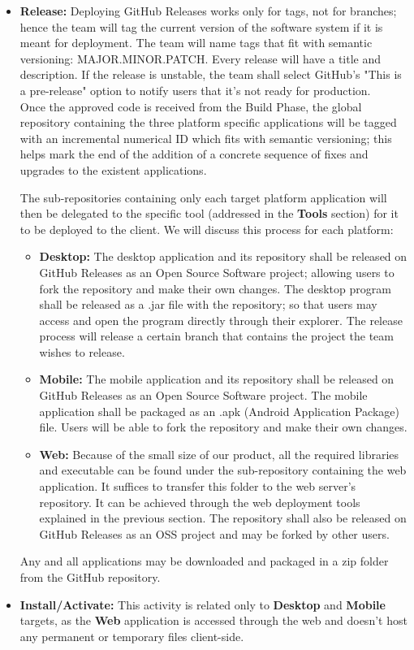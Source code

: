 \documentclass[12pt]{report}
\begin{document}
\begin{itemize}
   \item \textbf{Release:}
   Deploying GitHub Releases works only for tags, not for branches; hence the team will tag the current version of the software system if it is meant for deployment. The team will name tags that fit with semantic versioning: MAJOR.MINOR.PATCH. Every release will have a title and description. If the release is unstable, the team shall select GitHub's "This is a pre-release" option to notify users that it's not ready for production.\\
   
   Once the approved code is received from the Build Phase, the global repository containing the three platform specific applications will be tagged with an incremental numerical ID which fits with semantic versioning; this helps mark the end of the addition of a concrete sequence of fixes and upgrades to the existent applications. 
   
   The sub-repositories containing only each target platform application will then be delegated to the specific tool (addressed in the \textbf{Tools} section) for it to be deployed to the client. We will discuss this process for each platform:
   \begin{itemize}
   	\item \textbf{Desktop:} The desktop application and its repository shall be released on GitHub Releases as an Open Source Software project; allowing users to fork the repository and make their own changes. The desktop program shall be released as a .jar file with the repository; so that users may access and open the program directly through their explorer. The release process will release a certain branch that contains the project the team wishes to release.
   	\item \textbf{Mobile:} The mobile application and its repository shall be released on GitHub Releases as an Open Source Software project. The mobile application shall be packaged as an .apk (Android Application Package) file. Users will be able to fork the repository and make their own changes.
   	\item \textbf{Web:} Because of the small size of our product, all the required libraries and executable can be found under the sub-repository containing the web application. It suffices to transfer this folder to the web server's repository. It can be achieved through the web deployment tools explained in the previous section. The repository shall also be released on GitHub Releases as an OSS project and may be forked by other users.
   \end{itemize}
   Any and all applications may be downloaded and packaged in a zip folder from the GitHub repository.
   \item \textbf{Install/Activate:}
   This activity is related only to \textbf{Desktop} and \textbf{Mobile} targets, as the \textbf{Web} application is accessed through the web and doesn't host any permanent or temporary files client-side.
   

\end{itemize}
\end{document}
